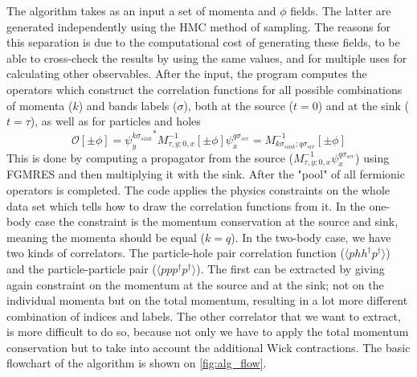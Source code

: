 The algorithm takes as an input a set of momenta and $\phi$ fields. The latter are generated independently using the HMC method of sampling. The reasons for this separation is due to the computational cost of generating these fields, to be able to cross-check the results by using the same values, and for multiple uses for calculating other observables. After the input, the program computes the operators which construct the correlation functions for all possible combinations of momenta ($k$) and bands labels ($\sigma$), both at the source ($t=0$) and at the sink ($t=\tau$), as well as for particles and holes
\begin{equation}
    \mathcal{O}[\pm\phi] = {\psi^{k\sigma_{sink}}_{y}}^{*}M^{-1}_{\tau,y;0,x}[\pm\phi]\psi^{q\sigma_{scr}}_{x} = M^{-1}_{k\sigma_{sink};q\sigma_{scr}}[\pm\phi]
\end{equation}
This is done by computing a propagator from the source ($M^{-1}_{\tau,y;0,x}\psi^{q\sigma_{scr}}_{x}$) using FGMRES and then multiplying it with the sink. After the "pool" of all fermionic operators is completed. The code applies the physics constraints on the whole data set which tells how to draw the correlation functions from it. In the one-body case the constraint is the momentum conservation at the source and sink, meaning the momenta should be equal ($k=q$). In the two-body case, we have two kinds of correlators. The particle-hole pair correlation function ($\langle phh^\dagger p^\dagger\rangle$) and the particle-particle pair ($\langle ppp^\dagger p^\dagger\rangle$). The first can be extracted by giving again constraint on the momentum at the source and at the sink; not on the individual momenta but on the total momentum, resulting in a lot more different combination of indices and labels. The other correlator that we want to extract, is more difficult to do so, because not only we have to apply the total momentum conservation but to take into account the additional Wick contractions. The basic flowchart of the algorithm is shown on \cref{fig:alg_flow}.
